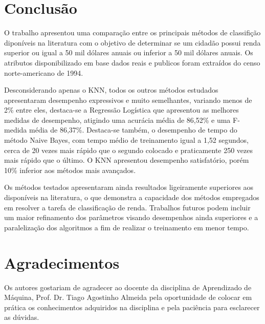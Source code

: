\section{Conclusão}

O trabalho apresentou uma comparação entre os principais métodos de classifição diponíveis na literatura com o objetivo de determinar se um cidadão possui renda superior ou igual a 50 mil dólares anuais ou inferior a 50 mil dólares anuais. Os atributos disponibilizado em base dados reais e publicos foram extraídos do censo norte-americano de 1994.

Desconsiderando apenas o KNN, todos os outros métodos estudados apresentaram desempenho expressivos e muito semelhantes, variando menos de 2\% entre eles, destaca-se a Regressão Logística que apresentou as melhores medidas de desempenho, atigindo uma acurácia média de 86,52\% e uma F-medida média de 86,37\%. Destaca-se também, o desempenho de tempo do método Naive Bayes, com tempo médio de treinamento igual a 1,52 segundos, cerca de 20 vezes mais rápido que o segundo colocado e praticamente 250 vezes mais rápido que o último. O KNN apresentou desempenho satisfatório, porém 10\% inferior aos métodos mais avançados.

Os métodos testados apresentaram ainda resultados ligeiramente superiores aos disponíveis na literatura, o que demonstra a capacidade dos métodos empregados em resolver a tarefa de classificação de renda. Trabalhos futuros podem incluir um maior refinamento dos parâmetros visando desempenhos ainda superiores e a paralelização dos algoritmos a fim de realizar o treinamento em menor tempo.

\section*{Agradecimentos}
Os autores gostariam de agradecer ao docente da disciplina de Aprendizado de Máquina, Prof. Dr. Tiago Agostinho Almeida pela oportunidade de colocar em prática os conhecimentos adquiridos na disciplina e pela paciência para esclarecer as dúvidas.
